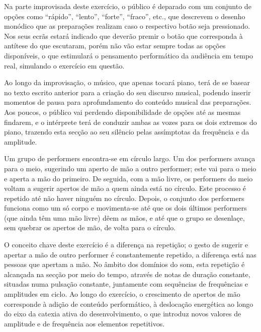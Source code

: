 \documentclass[../main.tex]{subfiles}
\begin{document}
Na parte improvisada deste exercício, o público é deparado com um conjunto de opções como \enquote{rápido}, \enquote{lento}, \enquote{forte}, \enquote{fraco}, etc., que descrevem o desenho monódico que as preparações realizam caso o respectivo botão seja pressionado. Nos seus ecrãs estará indicado que deverão premir o botão que corresponda à antítese do que escutaram, porém não vão estar sempre todas as opções disponíveis, o que estimulará o pensamento performático da audiência em tempo real, simulando o exercício em questão.

Ao longo da improvisação, o músico, que apenas tocará piano, terá de se basear no texto escrito anterior para a criação do seu discurso musical, podendo inserir momentos de pausa para aprofundamento do conteúdo musical das preparações. Aos poucos, o público vai perdendo disponibilidade de opções até as mesmas findarem, e o intérprete terá de conduzir ambas as vozes para os dois extremos do piano, trazendo esta secção ao seu silêncio pelas assímptotas da frequência e da amplitude.

\begin{performex}
    Um grupo de performers encontra-se em círculo largo. Um dos performers avança para o meio, sugerindo um aperto de mão a outro performer; este vai para o meio e aperta a mão do primeiro. De seguida, com a mão livre, os performers do meio voltam a sugerir apertos de mão a quem ainda está no círculo. Este processo é repetido até não haver ninguém no círculo. Depois, o conjunto dos performers funciona como um só corpo e movimenta-se até que os dois últimos performers (que ainda têm uma mão livre) dêem as mãos, e até que o grupo se desenlaçe, sem quebrar os apertos de mão, de volta para o círculo.
\end{performex}

O conceito chave deste exercício é a diferença na repetição; o gesto de sugerir e apertar a mão de outro performer é constantemente repetido, a diferença está nas pessoas que apertam a mão. No âmbito dos domínios do som, esta repetição é alcançada na secção por meio do tempo, através de notas de duração constante, situadas numa pulsação constante, juntamente com sequências de frequências e amplitudes em ciclo. Ao longo do exercício, o crescimento de apertos de mão corresponde à adição de conteúdo performático, à deslocação energética ao longo do eixo da catexia ativa do desenvolvimento, o que introduz novos valores de amplitude e de frequência aos elementos repetitivos.
\end{document}
